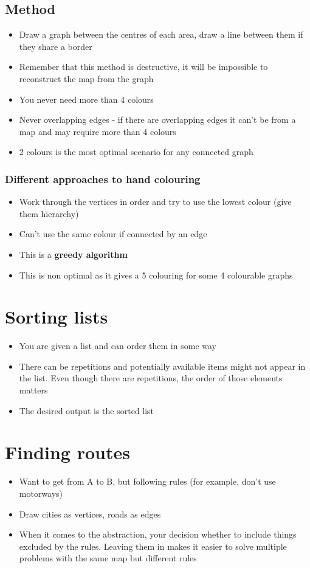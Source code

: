 \documentclass{article}[18pt]
\begin{document}
\subsection{Method}
\begin{itemize}
\item Draw a graph between the centres of each area, draw a line between them if they share a border
\item Remember that this method is destructive, it will be impossible to reconstruct the map from the graph
\item You never need more than 4 colours
\item Never overlapping edges - if there are overlapping edges it can't be from a map and may require more than 4 colours
\item 2 colours is the most optimal scenario for any connected graph
\end{itemize}
\subsubsection{Different approaches to hand colouring}
\begin{itemize}
\item Work through the vertices in order and try to use the lowest colour (give them hierarchy)
\item Can't use the same colour if connected by an edge
\item This is a \textbf{greedy algorithm}
\item This is non optimal as it gives a 5 colouring for some 4 colourable graphs
\end{itemize}
\section{Sorting lists}
\begin{itemize}
\item You are given a list and can order them in some way
\item There can be repetitions and potentially available items might not appear in the list. Even though there are repetitions, the order of those elements matters
\item The desired output is the sorted list
\end{itemize}
\section{Finding routes}
\begin{itemize}
\item Want to get from A to B, but following rules (for example, don't use motorways)
\item Draw cities as vertices, roads as edges
\item When it comes to the abstraction, your decision whether to include things excluded by the rules. Leaving them in makes it easier to solve multiple problems with the same map but different rules
\end{itemize}
\end{document}
